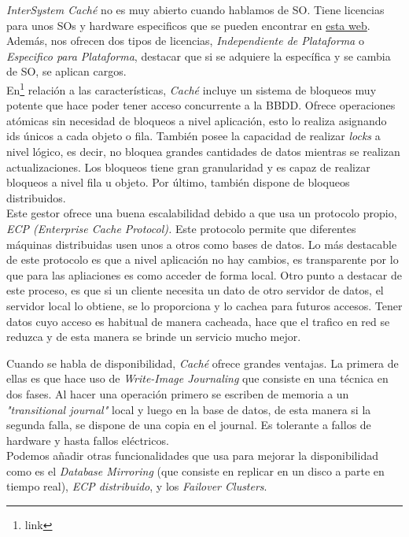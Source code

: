 \documentclass[10pt]{article}
\begin{document}
\emph{InterSystem Caché }no es muy abierto cuando hablamos de SO. Tiene licencias para unos SOs y hardware especificos que se pueden encontrar en \href{https://www.intersystems.com/support-learning/support/cache-licensing-platforms/}{esta web}. Además, nos ofrecen dos tipos de licencias, \emph{Independiente de Plataforma} o \emph{Especifico para Plataforma}, destacar que si se adquiere la específica y se cambia de SO, se aplican cargos. \cite{CACHE:1} \\

En\footnote{link} relación a las características, \emph{Caché} incluye un sistema de bloqueos muy potente que hace poder tener acceso concurrente a la BBDD. Ofrece operaciones atómicas sin necesidad de bloqueos a nivel aplicación, esto lo realiza asignando ids únicos a cada objeto o fila. También posee la capacidad de realizar \emph{locks} a nivel lógico, es decir, no bloquea grandes cantidades de datos mientras se realizan actualizaciones. Los bloqueos tiene gran granularidad y es capaz de realizar bloqueos a nivel fila u objeto. Por último, también dispone de bloqueos distribuidos.\\

Este gestor ofrece una buena escalabilidad debido a que usa un protocolo propio, \emph{ECP (Enterprise Cache Protocol).} Este protocolo permite que diferentes máquinas distribuidas usen unos a otros como bases de datos. Lo más destacable de este protocolo es que a nivel aplicación no hay cambios, es transparente por lo que para las apliaciones es como acceder de forma local. Otro punto a destacar de este proceso, es que si un cliente necesita un dato de otro servidor de datos, el servidor local lo obtiene, se lo proporciona y lo cachea para futuros accesos. Tener datos cuyo acceso es habitual de manera cacheada, hace que el trafico en red se reduzca y de esta manera se brinde un servicio mucho mejor.

Cuando  se habla de disponibilidad, \emph{Caché} ofrece grandes ventajas. La primera de ellas es que hace uso de \emph{Write-Image Journaling} que consiste en una técnica en dos fases. Al hacer una operación primero se escriben de memoria a un \emph{"transitional journal"} local  y luego en la base de datos, de esta manera si la segunda falla, se dispone de una copia en el journal. Es tolerante a fallos de hardware y hasta fallos eléctricos. \\
Podemos añadir otras funcionalidades que usa para mejorar la disponibilidad como es el \emph{Database Mirroring} (que consiste en replicar en un disco a parte en tiempo real), \emph{ECP distribuido}, y los \emph{Failover Clusters}. \cite{CACHE:2}\\
\end{document}
